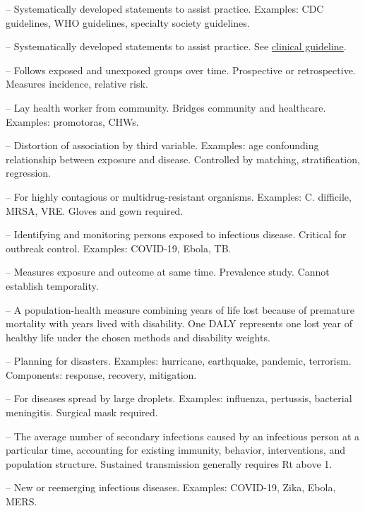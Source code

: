 -- Systematically developed statements to assist practice. Examples: CDC guidelines, WHO guidelines, specialty society guidelines.

-- Systematically developed statements to assist practice. See \hyperlink{Clinical Guideline}{clinical guideline}.


-- Follows exposed and unexposed groups over time. Prospective or retrospective. Measures incidence, relative risk.

-- Lay health worker from community. Bridges community and healthcare. Examples: promotoras, CHWs.

-- Distortion of association by third variable. Examples: age confounding relationship between exposure and disease. Controlled by matching, stratification, regression.

-- For highly contagious or multidrug-resistant organisms. Examples: C. difficile, MRSA, VRE. Gloves and gown required.


-- Identifying and monitoring persons exposed to infectious disease. Critical for outbreak control. Examples: COVID-19, Ebola, TB.


-- Measures exposure and outcome at same time. Prevalence study. Cannot establish temporality.

-- A population-health measure combining years of life lost because of premature mortality with years lived with disability. One DALY represents one lost year of healthy life under the chosen methods and disability weights.

-- Planning for disasters. Examples: hurricane, earthquake, pandemic, terrorism. Components: response, recovery, mitigation.

-- For diseases spread by large droplets. Examples: influenza, pertussis, bacterial meningitis. Surgical mask required.

-- The average number of secondary infections caused by an infectious person at a particular time, accounting for existing immunity, behavior, interventions, and population structure. Sustained transmission generally requires Rt above 1.


-- New or reemerging infectious diseases. Examples: COVID-19, Zika, Ebola, MERS.

